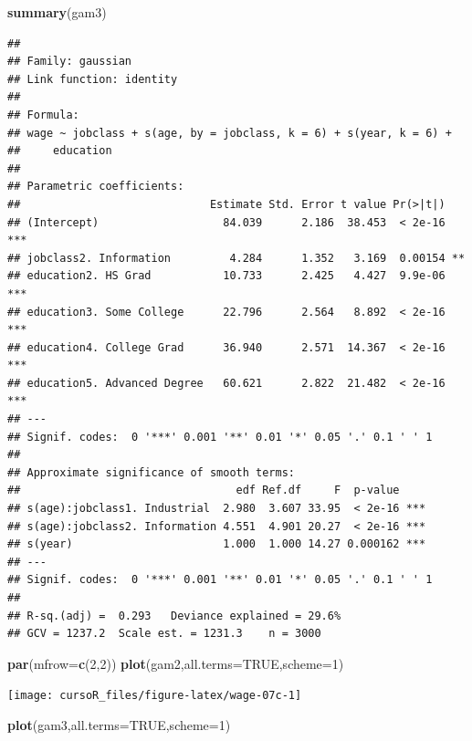 \documentclass[]{book}
\newenvironment{Shaded}{\begin{snugshade}}{\end{snugshade}}
\newcommand{\KeywordTok}[1]{\textcolor[rgb]{0.13,0.29,0.53}{\textbf{#1}}}
\newcommand{\DataTypeTok}[1]{\textcolor[rgb]{0.13,0.29,0.53}{#1}}
\newcommand{\DecValTok}[1]{\textcolor[rgb]{0.00,0.00,0.81}{#1}}
\newcommand{\OtherTok}[1]{\textcolor[rgb]{0.56,0.35,0.01}{#1}}
\newcommand{\NormalTok}[1]{#1}
\begin{document}
\begin{Shaded}
\begin{Highlighting}[]
\KeywordTok{summary}\NormalTok{(gam3)}
\end{Highlighting}
\end{Shaded}

\begin{verbatim}
## 
## Family: gaussian 
## Link function: identity 
## 
## Formula:
## wage ~ jobclass + s(age, by = jobclass, k = 6) + s(year, k = 6) + 
##     education
## 
## Parametric coefficients:
##                             Estimate Std. Error t value Pr(>|t|)    
## (Intercept)                   84.039      2.186  38.453  < 2e-16 ***
## jobclass2. Information         4.284      1.352   3.169  0.00154 ** 
## education2. HS Grad           10.733      2.425   4.427  9.9e-06 ***
## education3. Some College      22.796      2.564   8.892  < 2e-16 ***
## education4. College Grad      36.940      2.571  14.367  < 2e-16 ***
## education5. Advanced Degree   60.621      2.822  21.482  < 2e-16 ***
## ---
## Signif. codes:  0 '***' 0.001 '**' 0.01 '*' 0.05 '.' 0.1 ' ' 1
## 
## Approximate significance of smooth terms:
##                                 edf Ref.df     F  p-value    
## s(age):jobclass1. Industrial  2.980  3.607 33.95  < 2e-16 ***
## s(age):jobclass2. Information 4.551  4.901 20.27  < 2e-16 ***
## s(year)                       1.000  1.000 14.27 0.000162 ***
## ---
## Signif. codes:  0 '***' 0.001 '**' 0.01 '*' 0.05 '.' 0.1 ' ' 1
## 
## R-sq.(adj) =  0.293   Deviance explained = 29.6%
## GCV = 1237.2  Scale est. = 1231.3    n = 3000
\end{verbatim}

\begin{Shaded}
\begin{Highlighting}[]
\KeywordTok{par}\NormalTok{(}\DataTypeTok{mfrow=}\KeywordTok{c}\NormalTok{(}\DecValTok{2}\NormalTok{,}\DecValTok{2}\NormalTok{))}
\KeywordTok{plot}\NormalTok{(gam2,}\DataTypeTok{all.terms=}\OtherTok{TRUE}\NormalTok{,}\DataTypeTok{scheme=}\DecValTok{1}\NormalTok{)}
\end{Highlighting}
\end{Shaded}

\begin{center}\texttt{[image: cursoR\_files/figure-latex/wage-07c-1]} \end{center}

\begin{Shaded}
\begin{Highlighting}[]
\KeywordTok{plot}\NormalTok{(gam3,}\DataTypeTok{all.terms=}\OtherTok{TRUE}\NormalTok{,}\DataTypeTok{scheme=}\DecValTok{1}\NormalTok{)}
\end{Highlighting}
\end{Shaded}
\end{document}
